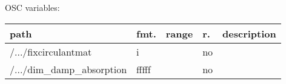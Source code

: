 \begin{snugshade}
{\footnotesize
\label{osctab:receivermodsimplefdn}
OSC variables:
\nopagebreak

\begin{tabularx}{\textwidth}{llllX}
\hline
path & fmt. & range & r. & description\\
\hline
/.../fixcirculantmat & i &  & no & \\
/.../dim\_damp\_absorption & fffff &  & no & \\
\hline
\end{tabularx}
}
\end{snugshade}
